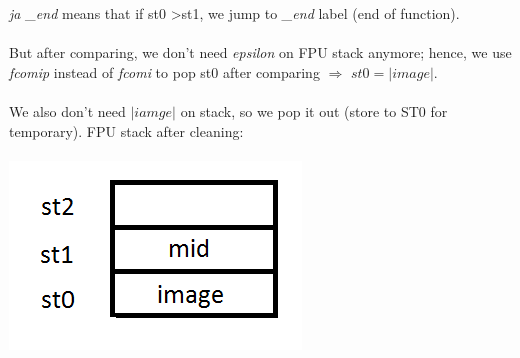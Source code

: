 \documentclass{article}
\begin{document}
\begin{multicols}{2}
\textit{ja \_end} means that if st0 \textgreater st1, we jump to \textit{\_end} label (end of function). \\ \\
But after comparing, we don't need \textit{epsilon} on FPU stack anymore; hence, we use \textit{fcomip} instead of \textit{fcomi} to pop st0 after comparing $\Rightarrow$ $st0 = |image|$. \\ \\
We also don't need $|iamge|$ on stack, so we pop it out (store to ST0 for temporary). FPU stack after cleaning: \\ \\
\includegraphics[scale=0.5]{stack2.png} \\
\end{multicols}
\pagebreak
\end{document}
